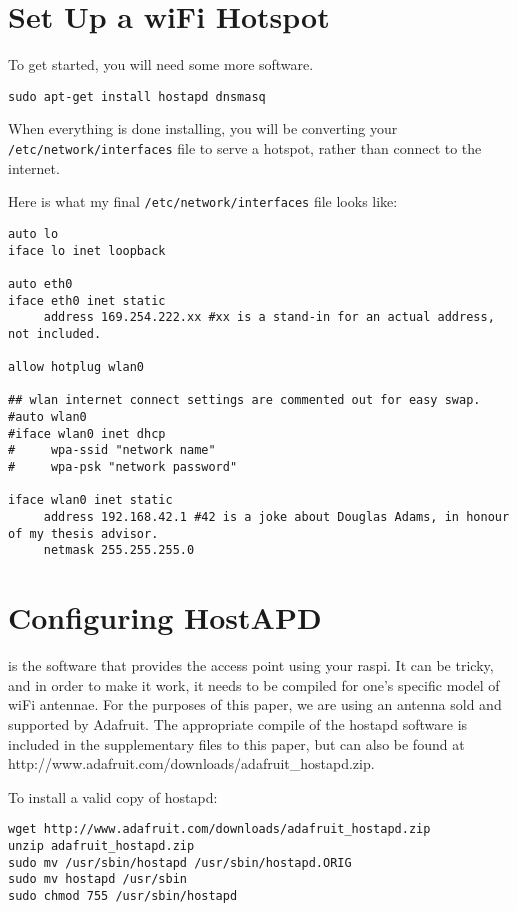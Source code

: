 \section{Set Up a wiFi Hotspot}
To get started, you will need some more software.

\begin{lstlisting}
sudo apt-get install hostapd dnsmasq
\end{lstlisting}

When everything is done installing, you will be converting your \texttt{/etc/network/interfaces} file to serve a hotspot, rather than connect to the internet. 

Here is what my final \texttt{/etc/network/interfaces} file looks like:

\begin{lstlisting}
auto lo
iface lo inet loopback

auto eth0
iface eth0 inet static
     address 169.254.222.xx #xx is a stand-in for an actual address, not included.

allow hotplug wlan0

## wlan internet connect settings are commented out for easy swap.
#auto wlan0
#iface wlan0 inet dhcp
#     wpa-ssid "network name"
#     wpa-psk "network password"

iface wlan0 inet static
     address 192.168.42.1 #42 is a joke about Douglas Adams, in honour of my thesis advisor.
     netmask 255.255.255.0

\end{lstlisting}

\section{Configuring HostAPD}
 is the software that provides the access point using your raspi. It can be tricky, and in order to make it work, it needs to be compiled for one's specific model of wiFi antennae. For the purposes of this paper, we are using an antenna sold and supported by Adafruit. The appropriate compile of the hostapd software is included in the supplementary files to this paper, but can also be found at http://www.adafruit.com/downloads/adafruit_hostapd.zip.

To install a valid copy of hostapd:
\begin{lstlisting}
wget http://www.adafruit.com/downloads/adafruit_hostapd.zip 
unzip adafruit_hostapd.zip 
sudo mv /usr/sbin/hostapd /usr/sbin/hostapd.ORIG 
sudo mv hostapd /usr/sbin
sudo chmod 755 /usr/sbin/hostapd
\end{lstlisting}
 
